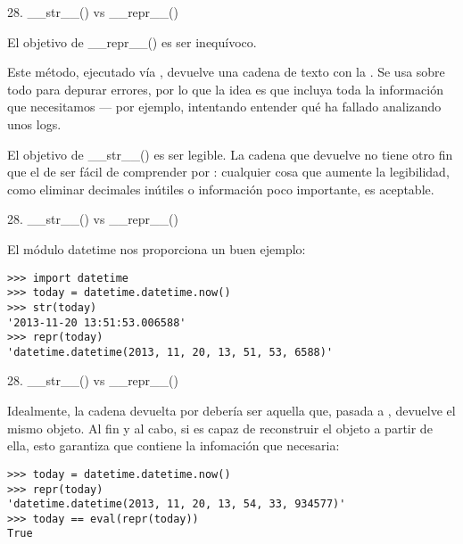 \begin{frame}{28. \_\_str\_\_() vs \_\_repr\_\_()}

  \footnotesize
  \begin{alertblock}
    {\centering
      \small
      El objetivo de \_\_repr\_\_() es ser inequívoco.
    }
    \centering

    {Este método, ejecutado vía , devuelve una
      cadena de texto con la . Se usa sobre todo para depurar errores, por lo que la
      idea es que incluya toda la información que necesitamos --- por
      ejemplo, intentando entender qué ha fallado analizando unos
      logs.  }
  \end{alertblock}

  \begin{block}
    {\centering
      \small
      El objetivo de \_\_str\_\_() es ser legible.
    }
    \centering
    {\footnotesize
      La cadena que devuelve  no tiene otro fin que
      el de ser fácil de comprender por : cualquier
      cosa que aumente la legibilidad, como eliminar decimales
      inútiles o información poco importante, es aceptable.
    }
  \end{block}
\end{frame}

\begin{frame}[fragile]{28. \_\_str\_\_() vs \_\_repr\_\_()}
  \footnotesize
  \begin{exampleblock}
    {El módulo datetime nos proporciona un buen ejemplo:}
    \begin{lstlisting}
>>> import datetime
>>> today = datetime.datetime.now()
>>> str(today)
'2013-11-20 13:51:53.006588'
>>> repr(today)
'datetime.datetime(2013, 11, 20, 13, 51, 53, 6588)'
    \end{lstlisting}
  \end{exampleblock}
\end{frame}

\begin{frame}[fragile]{28. \_\_str\_\_() vs \_\_repr\_\_()}
  \small
  \begin{block}{}
    \centering
    Idealmente, la cadena devuelta por 
    debería ser aquella que, pasada a , devuelve el
    mismo objeto. Al fin y al cabo, si  es capaz de
    reconstruir el objeto a partir de ella, esto garantiza que
    contiene  la infomación que necesaria:
  \end{block}

  \footnotesize
  \begin{exampleblock} {}
    \begin{lstlisting}
>>> today = datetime.datetime.now()
>>> repr(today)
'datetime.datetime(2013, 11, 20, 13, 54, 33, 934577)'
>>> today == eval(repr(today))
True
    \end{lstlisting}
  \end{exampleblock}
\end{frame}

